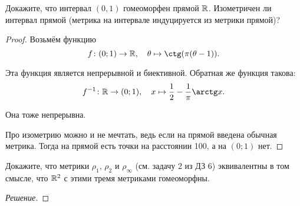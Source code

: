 \documentclass[10pt]{article}
\begin{document}
\date{20 января 2025}

\begin{tasks}
    \item Докажите, что интервал $(0,1)$ гомеоморфен прямой $\mathbb R$. Изометричен ли интервал прямой (метрика на интервале индуцируется из метрики прямой)?
    \begin{proof}
        Возьмём функцию $$f\colon (0;1) \to \R, \quad \theta \mapsto \ctg(\pi(\theta-1)).$$

        Эта функция является непрерывной и биективной. Обратная же функция такова: $$f^{-1}\colon \R \to (0;1), \quad x \mapsto \frac 1 2 - \frac 1 \pi\arctg x.$$

        Она тоже непрерывна.

        \begin{figure}[h]
            \centering
        \end{figure}

        Про изометрию можно и не мечтать, ведь если на прямой введена обычная метрика. Тогда на прямой есть точки на расстоянии 100, а на $(0;1)$ нет.
    \end{proof}
    \pagebreak
    \item Докажите, что метрики $\rho_1$, $\rho_2$ и $\rho_\infty$ (см. задачу 2 из ДЗ 6) эквивалентны в том смысле, что $\mathbb R^2$ с этими тремя метриками гомеоморфны.
    \begin{proof}[Решение]
        \phantom{sfafd}
        

\end{proof}
\end{tasks}
\end{document}
